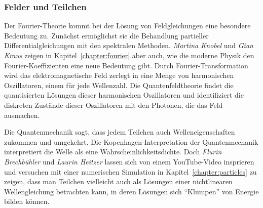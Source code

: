 %
%
\subsubsection{Felder und Teilchen}

%
%
Der Fourier-Theorie kommt bei der Lösung von Feldgleichungen eine
besondere Bedeutung zu.
%
Zunächst ermöglichst sie die Behandlung partieller Differentialgleichungen
mit den spektralen Methoden.
%
\emph{Martina Knobel}
%
%
und \emph{Gian Kraus}
%
%
zeigen in Kapitel~\ref{chapter:fourier} aber auch, wie die moderne
Physik den Fourier-Koeffizienten eine neue Bedeutung gibt.
Durch Fourier-Transformation wird das elektromagnetische Feld
zerlegt in eine Menge von harmonischen Oszillatoren, einem für jede
Wellenzahl.
%
%
Die Quantenfeldtheorie findet die quantisierten Lösungen dieser
%
harmonischen Oszillatoren und identifiziert die diskreten Zustände
dieser Oszillatoren mit den Photonen, die das Feld ausmachen.
%

%
%
Die Quantenmechanik sagt, dass jedem Teilchen auch Welleneigenschaften
%
zukommen und umgekehrt.
Die Kopenhagen-Interpretation der Quantenmechanik interpretiert die
Welle als eine Wahrscheinlichkeitsdichte.
Doch
\emph{Flurin Brechbühler}
%
%
und
\emph{Laurin Heitzer}
%
lassen sich von einem YouTube-Video insprieren und versuchen mit einer
numerischen Simulation in Kapitel~\ref{chapter:particles} zu zeigen,
dass man Teilchen vielleicht auch
als Lösungen einer nichtlinearen Wellengleichung betrachten kann,
in deren Lösungen sich ``Klumpen'' von Energie bilden können.
